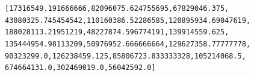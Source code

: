 \documentclass[letterpaper,10pt,english]{/usr/local/lib/python2.7/dist-packages/sphinx/texinputs/sphinxhowto}
\newenvironment{InvisibleVerbatim}
        {\begin{mdframed}[leftmargin=0.1\linewidth,innerleftmargin=3pt,innerrightmargin=3pt, userdefinedwidth=1\linewidth, linewidth=0pt, linecolor=white, usetwoside=false]}
        {\end{mdframed}}
\begin{document}
    

        
        

            
                \begin{InvisibleVerbatim}
                \vspace{-0.5\baselineskip}
\begin{alltt}[17316549.191666666, 82096075.624755695, 67829046.375,
43080325.745454542, 110160386.52286585, 120895934.69047619,
188028113.21951219, 48227874.596774191, 139914559.625,
135444954.98113209, 50976952.666666664, 129627358.77777778,
90323299.0, 126238459.125, 85806723.833333328, 105214068.5,
674664131.0, 302469019.0, 56042592.0]
\end{alltt}

            \end{InvisibleVerbatim}
            
        
    


\end{document}
